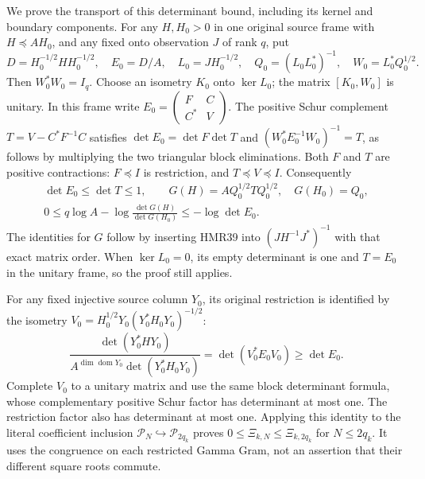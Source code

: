 We prove the transport of this determinant bound, including
its kernel and boundary components. For any $H,H_0>0$ in
one original source frame with $H\preceq A H_0$, and any
fixed onto observation $J$ of rank $q$, put
\[
 D=H_0^{-1/2}HH_0^{-1/2},\quad E_0=D/A,\quad
 L_0=JH_0^{-1/2},\quad Q_0=(L_0L_0^*)^{-1},\quad
 W_0=L_0^*Q_0^{1/2}.
 \tag{HMR39}
\]
Then $W_0^*W_0=I_q$. Choose an isometry $K_0$ onto
$\ker L_0$; the matrix $[K_0,W_0]$ is unitary. In this
frame write
$E_0=\left(\begin{smallmatrix}F&C\\C^*&V\end{smallmatrix}\right)$.
The positive Schur complement $T=V-C^*F^{-1}C$ satisfies
$\det E_0=\det F\det T$ and
$(W_0^*E_0^{-1}W_0)^{-1}=T$, as follows by multiplying
the two triangular block eliminations. Both $F$ and $T$
are positive contractions: $F\preceq I$ is restriction,
and $T\preceq V\preceq I$. Consequently
\[
\begin{gathered}
 \det E_0\leq\det T\leq1,\qquad
 G(H)=A Q_0^{1/2}TQ_0^{1/2},\quad G(H_0)=Q_0,\\
 0\leq q\log A-\log\frac{\det G(H)}{\det G(H_0)}
       \leq-\log\det E_0 .
\end{gathered}\tag{HMR40}
\]
The identities for $G$ follow by inserting HMR39 into
$(JH^{-1}J^*)^{-1}$ with that exact matrix order.
When $\ker L_0=0$, its empty determinant is one and
$T=E_0$ in the unitary frame, so the proof still applies.

For any fixed injective source column $Y_0$, its original
restriction is identified by the isometry
$V_0=H_0^{1/2}Y_0(Y_0^*H_0Y_0)^{-1/2}$:
\[
 \frac{\det(Y_0^*HY_0)}
 {A^{\dim\operatorname{dom}Y_0}\det(Y_0^*H_0Y_0)}
       =\det(V_0^*E_0V_0)\geq\det E_0.
\]
Complete $V_0$ to a unitary matrix and use the same block
determinant formula, whose complementary positive Schur
factor has determinant at most one. The restriction factor
also has determinant at most one. Applying this identity to
the literal coefficient inclusion $\mathcal P_N\hookrightarrow
\mathcal P_{2q_k}$ proves
$0\leq\Xi_{k,N}\leq\Xi_{k,2q_k}$ for $N\leq2q_k$.
It uses the congruence on each restricted Gamma Gram,
not an assertion that their different square roots commute.

